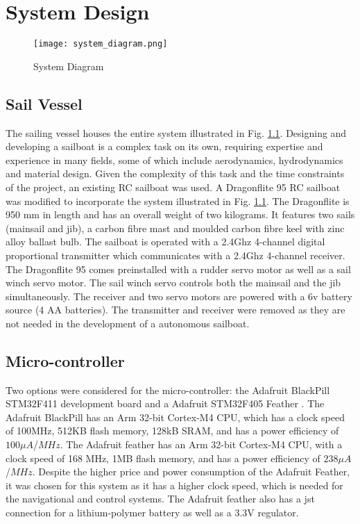 \graphicspath{{system_design/fig/}}

\chapter{System Design}
\label{chap:system_design}

\begin{figure}[!h]
  \centering
  \texttt{[image: system\_diagram.png]}
  \caption[System Diagram]{System Diagram}
  \label{fig:system_diagram}
\end{figure}

\section{Sail Vessel}
The sailing vessel houses the entire system illustrated in Fig. \ref{fig:system_diagram}. Designing and developing a sailboat is a complex task on its own, 
requiring expertise and experience in many fields, some of which include aerodynamics, hydrodynamics and material design. Given the complexity of this task 
and the time constraints of the project, an existing RC sailboat was used. A Dragonflite 95 RC sailboat\cite{Dragonflite} was modified to incorporate the system illustrated 
in Fig. \ref{fig:system_diagram}. The Dragonflite is 950 mm in length and has an overall weight of two kilograms. It features two sails (mainsail and jib),  
a carbon fibre mast and moulded carbon fibre keel with zinc alloy ballast bulb. The sailboat is operated
with a 2.4Ghz 4-channel digital proportional transmitter which communicates with a 2.4Ghz 4-channel receiver. The Dragonflite 95 comes preinstalled with a rudder 
servo motor as well as a sail winch servo motor. The sail winch servo controls both the mainsail 
and the jib simultaneously. The receiver and two servo motors are powered with a 6v battery source (4 AA batteries). The transmitter and receiver were 
removed as they are not needed in the development of a autonomous sailboat.

\section{Micro-controller}
Two options were considered for the micro-controller: the Adafruit BlackPill STM32F411 development board \cite{black_pill} and a Adafruit STM32F405 Feather \cite{feather}.
 The Adafruit BlackPill
has an Arm 32-bit Cortex-M4 CPU, which has a clock speed of 100MHz, 512KB flash memory, 128kB SRAM, and has a power efficiency
of $100\mu A$/$MHz$. The Adafruit feather has an Arm 32-bit Cortex-M4 CPU, with a clock speed of 168 MHz, 1MB flash memory, 
and has a power efficiency of $238\mu A$/$MHz$. Despite the higher price and power consumption of the Adafruit Feather, it was chosen for this system as it has a 
higher clock speed, which is needed for the navigational and control systems. The Adafruit feather also has a jst connection for a lithium-polymer battery as well as a 
3.3V regulator.


